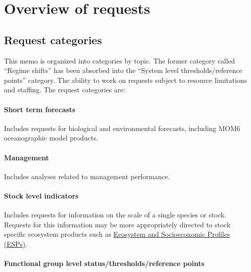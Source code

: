 \documentclass[
  10pt,
]{article}
\begin{document}
\newpage

\section{Overview of requests}\label{overview-of-requests}

\subsection{Request categories}\label{request-categories}

This memo is organized into categories by topic. The former category
called ``Regime shifts'' has been absorbed into the ``System level
thresholds/reference points'' category. The ability to work on requests
subject to resource limitations and staffing. The request categories
are:

\paragraph{Short term forecasts}\label{short-term-forecasts}

Includes requests for biological and environmental forecasts, including
MOM6 oceanographic model products.

\paragraph{Management}\label{management}

Includes analyses related to management performance.

\paragraph{Stock level indicators}\label{stock-level-indicators}

Includes requests for information on the scale of a single species or
stock. Requests for this information may be more appropriately directed
to stock specific ecosystem products such as
\href{https://www.fisheries.noaa.gov/new-england-mid-atlantic/science-data/ecosystem-and-socioeconomic-profiles-northeast-united-states}{Ecosystem
and Socioeconomic Profiles (ESPs)}.

\paragraph{Functional group level status/thresholds/reference
points}\label{functional-group-level-statusthresholdsreference-points}
\end{document}
